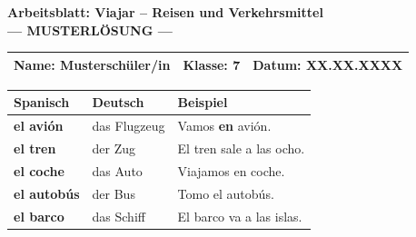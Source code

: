 \documentclass[11pt, a4paper]{article}
\newcommand{\fachfarbe}{spanisch}
\newcommand{\thema}{Viajar -- Reisen und Verkehrsmittel}
\newcommand{\klasse}{7}
\newcommand{\loesung}[1]{\textcolor{loesung}{\textbf{#1}}}
\begin{document}
\begin{center}
    {\Large\bfseries\textcolor{\fachfarbe}{Arbeitsblatt: \thema}}\\[0.3em]
    {\large\textcolor{loesung}{\textbf{--- MUSTERLÖSUNG ---}}}
\end{center}

\vspace{5pt}

\noindent
\begin{tabularx}{\textwidth}{|X|X|X|}
\hline
\textbf{Name:} \textcolor{loesung}{Musterschüler/in} &
\textbf{Klasse:} \klasse &
\textbf{Datum:} \textcolor{loesung}{XX.XX.XXXX} \\
\hline
\end{tabularx}

\vspace{15pt}


\begin{merkkasten}

\begin{center}
\begin{tabular}{|l|l|l|}
\hline
\textbf{Spanisch} & \textbf{Deutsch} & \textbf{Beispiel} \\
\hline
\loesung{el avión} & das Flugzeug & Vamos \loesung{en} avión. \\
\hline
\loesung{el tren} & der Zug & El tren sale a las ocho. \\
\hline
\loesung{el coche} & das Auto & Viajamos en coche. \\
\hline
\loesung{el autobús} & der Bus & Tomo el autobús. \\
\hline
\loesung{el barco} & das Schiff & El barco va a las islas. \\
\hline
\end{tabular}
\end{center}

\end{merkkasten}

\vspace{10pt}

\end{document}
